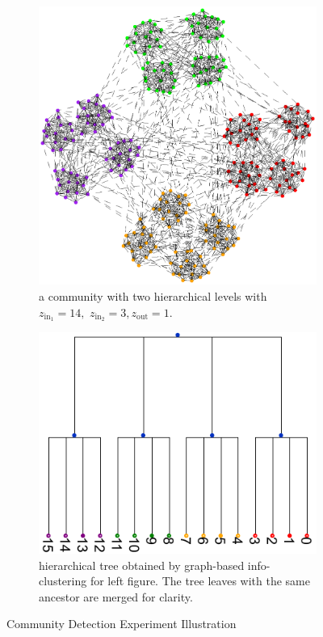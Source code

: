 \begin{figure}
	\centering
	\begin{subfigure}{0.45\textwidth}
		\includegraphics[width=\textwidth]{pic/two_level.eps}
		\caption{a community with two hierarchical levels with $z_{\mathrm{in}_1} = 14,$ $z_{\mathrm{in}_2} = 3, z_{\mathrm{out}}=1$.}\label{fig:c1}
	\end{subfigure}
	\begin{subfigure}{0.45\textwidth}
		\includegraphics[width=\textwidth]{pic/tree_info-clustering.pdf}
		\caption{hierarchical tree obtained by graph-based info-clustering for left figure. The tree leaves with the same ancestor are merged for clarity.}\label{fig:c2}
	\end{subfigure}
	\caption{Community Detection Experiment Illustration}
\end{figure}

